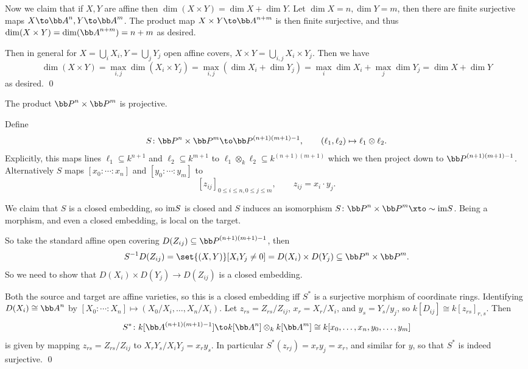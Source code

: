     Now we claim that if $X,Y$ are affine then $\dim(X\times Y)=\dim X+\dim Y$.
    Let $\dim X=n,\dim Y=m$, then there are finite surjective maps $X\to\bA^n,Y\to\bA^m$.
    The product map $X\times Y\to\bA^{n+m}$ is then finite surjective, and thus $\dim(X\times Y)=\dim(\bA^{n+m})=n+m$ as desired.

    Then in general for $X=\bigcup_iX_i,Y=\bigcup_jY_j$ open affine covers, $X\times Y=\bigcup_{i,j}X_i\times Y_j$.
    Then we have
    $$ \dim(X\times Y) = \max_{i,j}\dim(X_i\times Y_j) = \max_{i,j}(\dim X_i+\dim Y_j) = \max_i\dim X_i + \max_j\dim Y_j = \dim X + \dim Y $$
    as desired.
    \qed

\eproof

\bthrm

    The product $\bP^n\times\bP^m$ is projective.

\ethrm

\bproof

    Define
    $$ S\colon\bP^n\times\bP^m\to\bP^{(n+1)(m+1)-1},\qquad (\ell_1,\ell_2)\mapsto\ell_1\otimes\ell_2 . $$
    Explicitly, this maps lines $\ell_1\subseteq k^{n+1}$ and $\ell_2\subseteq k^{m+1}$ to $\ell_1\otimes_k\ell_2\subseteq k^{(n+1)(m+1)}$
    which we then project down to $\bP^{(n+1)(m+1)-1}$.
    Alternatively $S$ maps $[x_0:\cdots:x_n]$ and $[y_0:\cdots:y_m]$ to
    $$ [z_{ij}]_{0\leq i\leq n,0\leq j\leq m},\qquad z_{ij} = x_i\cdot y_j . $$

    We claim that $S$ is a closed embedding, so ${\rm im} S$ is closed and $S$ induces an isomorphism $S\colon\bP^n\times\bP^m\xto\sim\im S$.
    Being a morphism, and even a closed embedding, is local on the target.

    So take the standard affine open covering $D(Z_{ij})\subseteq\bP^{(n+1)(m+1)-1}$, then
    $$ S^{-1}D(Z_{ij}) = \set{(X,Y)}[X_iY_j\neq0] = D(X_i) \times D(Y_j) \subseteq \bP^n \times \bP^m . $$
    So we need to show that $D(X_i)\times D(Y_j)\to D(Z_{ij})$ is a closed embedding.

    Both the source and target are affine varieties, so this is a closed embedding iff $S^*$ is a surjective morphism of coordinate rings.
    Identifying $D(X_i)\cong\bA^n$ by $[X_0:\cdots:X_n]\mapsto(X_0/X_i,\dots,X_n/X_i)$.
    Let $z_{rs}=Z_{rs}/Z_{ij}$, $x_r=X_r/X_i$, and $y_s=Y_s/y_j$, so $k[D_{ij}]\cong k[z_{rs}]_{r,s}$.
    Then
    $$ S^*\colon k[\bA^{(n+1)(m+1)-1}] \to k[\bA^n] \otimes_k k[\bA^m] \cong k[x_0,\dots,x_n,y_0,\dots,y_m] $$
    is given by mapping $z_{rs}=Z_{rs}/Z_{ij}$ to $X_rY_s/X_iY_j=x_ry_s$.
    In particular $S^*(z_{rj})=x_ry_j=x_r$, and similar for $y$, so that $S^*$ is indeed surjective.
    \qed

